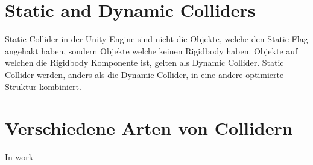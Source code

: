 \section{Static and Dynamic Colliders}
Static Collider in der Unity-Engine sind nicht die Objekte, welche den Static Flag angehakt haben, sondern Objekte welche keinen Rigidbody haben. Objekte auf welchen die Rigidbody Komponente ist, gelten als Dynamic Collider. Static Collider werden, anders als die Dynamic Collider, in eine andere optimierte Struktur kombiniert.
\cite{dickinson2015unity}

\section{Verschiedene Arten von Collidern}
In work
\cite{dickinson2015unity}